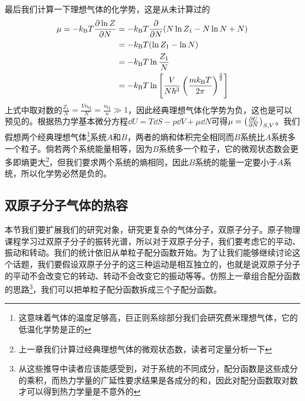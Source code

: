 \documentclass[../../main.tex]{subfiles}
\begin{document}
最后我们计算一下理想气体的化学势，这是从未计算过的
\begin{equation}
    \begin{split}
        \mu=-k_{\mathrm{B}} T\pdv{\ln Z}{N}&=-k_{\mathrm{B}} T\pdv{N}(N\ln Z_1-N\ln N+N) \\
        &=-k_{\mathrm{B}} T(\ln Z_1-\ln N) \\
        &=-k_{\mathrm{B}} T\ln\frac{Z_1}{N} \\
        &=-k_{\mathrm{B}} T\ln\left[\frac{V}{N\hbar^3}\left(\frac{mk_{\mathrm{B}} T}{2\pi}\right)^{\frac{3}{2}}\right]
    \end{split}
\end{equation}
上式中取对数的\(\frac{Z_1}{N}=\frac{Vn_{\text{Q}}}{N}=\frac{n_{\text{Q}}}{n}\gg 1\)，因此经典理想气体化学势为负，这也是可以预见的。根据热力学基本微分方程\(\dd U=T\dd S-p\dd V+\mu\dd N\)可得\(\mu=\left(\pdv{U}{N}\right)_{S,V}\)。我们假想两个经典理想气体\footnote{这意味着气体的温度足够高，巨正则系综部分我们会研究费米理想气体，它的低温化学势是正的}系统\(A\)和\(B\)，两者的熵和体积完全相同而\(B\)系统比\(A\)系统多一个粒子。倘若两个系统能量相等，因为\(B\)系统多一个粒子，它的微观状态数会更多即熵更大\footnote{上一章我们计算过经典理想气体的微观状态数，读者可定量分析一下}，但我们要求两个系统的熵相同，因此\(B\)系统的能量一定要小于\(A\)系统，所以化学势必然是负的。
\subsection{双原子分子气体的热容}

本节我们要扩展我们的研究对象，研究更复杂的气体分子，双原子分子。原子物理课程学习过双原子分子的振转光谱，所以对于双原子分子，我们要考虑它的平动、振动和转动。我们的统计依旧从单粒子配分函数开始。为了让我们能够继续讨论这个话题，我们要假设双原子分子的这三种运动是相互独立的，也就是说双原子分子的平动不会改变它的转动、转动不会改变它的振动等等。仿照上一章组合配分函数的思路\footnote{从这些推导中读者应该能感受到，对于系统的不同成分，配分函数是这些成分的乘积，而热力学量的广延性要求结果是各成分的和，因此对配分函数取对数才可以得到热力学量是不意外的}，我们可以把单粒子配分函数拆成三个子配分函数。
\end{document}
